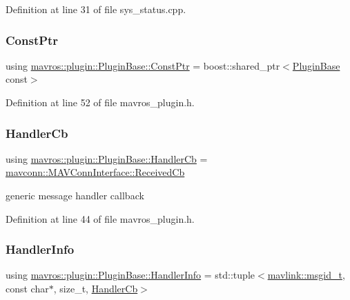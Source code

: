 Definition at line 31 of file sys\+\_\+status.\+cpp.

\mbox{\label{group__plugin_gaba13f33fe0f830b90b51bbe2d168f683}} 
\subsubsection{\texorpdfstring{ConstPtr}{ConstPtr}}
{\footnotesize\ttfamily using \mbox{\hyperlink{group__plugin_gaba13f33fe0f830b90b51bbe2d168f683}{mavros\+::plugin\+::\+Plugin\+Base\+::\+Const\+Ptr}} =  boost\+::shared\+\_\+ptr$<$\mbox{\hyperlink{classmavros_1_1plugin_1_1PluginBase}{Plugin\+Base}} const$>$}



Definition at line 52 of file mavros\+\_\+plugin.\+h.

\mbox{\label{group__plugin_ga51d7c95b43e74aa68c80ebe6b171e383}} 
\subsubsection{\texorpdfstring{HandlerCb}{HandlerCb}}
{\footnotesize\ttfamily using \mbox{\hyperlink{group__plugin_ga51d7c95b43e74aa68c80ebe6b171e383}{mavros\+::plugin\+::\+Plugin\+Base\+::\+Handler\+Cb}} =  \mbox{\hyperlink{group__mavconn_ga1d04ead963f1685f3aaf4b18ffb49ff7}{mavconn\+::\+M\+A\+V\+Conn\+Interface\+::\+Received\+Cb}}}



generic message handler callback 



Definition at line 44 of file mavros\+\_\+plugin.\+h.

\mbox{\label{group__plugin_gab973eb02b8f26a7b2b9cea37924317f1}} 
\subsubsection{\texorpdfstring{HandlerInfo}{HandlerInfo}}
{\footnotesize\ttfamily using \mbox{\hyperlink{group__plugin_gab973eb02b8f26a7b2b9cea37924317f1}{mavros\+::plugin\+::\+Plugin\+Base\+::\+Handler\+Info}} =  std\+::tuple$<$\mbox{\hyperlink{namespacemavlink_a98a1fe49b380ed1ea252d2c13bf3278d}{mavlink\+::msgid\+\_\+t}}, const char$\ast$, size\+\_\+t, \mbox{\hyperlink{group__plugin_ga51d7c95b43e74aa68c80ebe6b171e383}{Handler\+Cb}}$>$}



